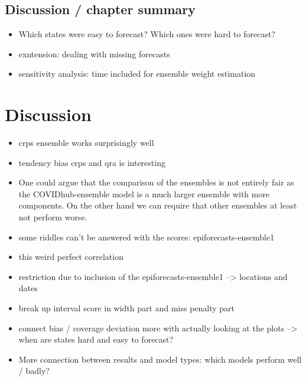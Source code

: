 \documentclass[
]{book}
\providecommand{\tightlist}{%
  \setlength{\itemsep}{0pt}\setlength{\parskip}{0pt}}
\begin{document}
\hypertarget{discussion-chapter-summary}{%
\section{Discussion / chapter summary}\label{discussion-chapter-summary}}

\begin{itemize}
\tightlist
\item
  Which states were easy to forecast? Which ones were hard to forecast?
\item
  exntension: dealing with missing forecasts
\item
  sensitivity analysis: time included for ensemble weight estimation
\end{itemize}

\hypertarget{discussion}{%
\chapter{Discussion}\label{discussion}}

\begin{itemize}
\item
  crps ensemble works surprisingly well
\item
  tendency bias crps and qra is interesting
\item
  One could argue that the comparison of the ensembles is not entirely fair as the COVIDhub-ensemble model is a much larger ensemble with more components. On the other hand we can require that other ensembles at least not perform worse.
\item
  some riddles can't be answered with the scores: epiforecasts-ensemble1
\item
  this weird perfect correlation
\item
  restriction due to inclusion of the epiforecasts-ensemble1 --\textgreater{} locations and dates
\item
  break up interval score in width part and miss penalty part
\item
  connect bias / coverage deviation more with actually looking at the plots --\textgreater{} when are states hard and easy to forecast?
\item
  More connection between results and model types: which models perform well / badly?
\end{itemize}

  
\end{document}
